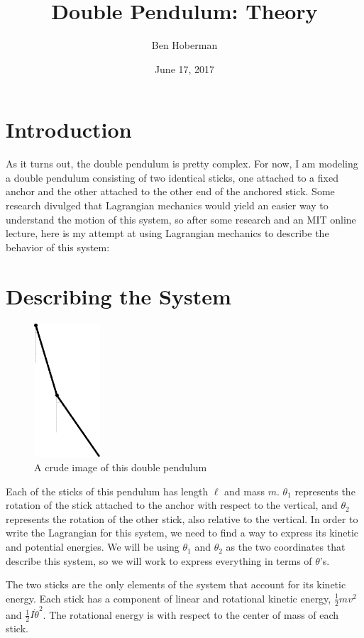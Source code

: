 \documentclass[]{article}
\title{Double Pendulum: Theory}
\author{Ben Hoberman}
\begin{document}
	
\date{June 17, 2017}
\maketitle

\section{Introduction}
As it turns out, the double pendulum is pretty complex. For now, I am modeling a double pendulum consisting of two identical sticks, one attached to a fixed anchor and the other attached to the other end of the anchored stick. Some research divulged that Lagrangian mechanics would yield an easier way to understand the motion of this system, so after some research and an MIT online lecture, here is my attempt at using Lagrangian mechanics to describe the behavior of this system:

\section{Describing the System}
\begin{figure}[h!]
	\includegraphics[height=5cm]{situation}
	\caption{A crude image of this double pendulum}
\end{figure}
Each of the sticks of this pendulum has length $\ell$ and mass $m$. $\theta_1$ represents the rotation of the stick attached to the anchor with respect to the vertical, and $\theta_2$ represents the rotation of the other stick, also relative to the vertical. In order to write the Lagrangian for this system, we need to find a way to express its kinetic and potential energies. We will be using $\theta_1$ and $\theta_2$ as the two coordinates that describe this system, so we will work to express everything in terms of $\theta$'s.

The two sticks are the only elements of the system that account for its kinetic energy. Each stick has a component of linear and rotational kinetic energy, $\frac{1}{2}mv^2$ and $\frac{1}{2}I\dot{\theta}^2$. The rotational energy is with respect to the center of mass of each stick.
\end{document}

